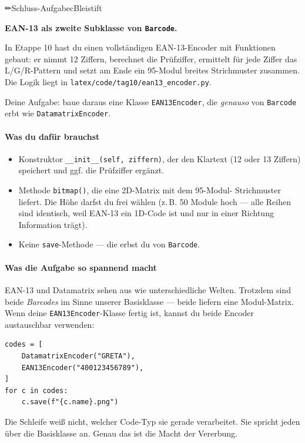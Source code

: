 \begin{aufgabe}{✏}{Schluss-}{Aufgabe}{cBleistift}{\bfseries
EAN-13 als zweite Subklasse von \texttt{Barcode}.\par}

In Etappe 10 hast du einen vollständigen EAN-13-Encoder mit Funktionen
gebaut: er nimmt 12 Ziffern, berechnet die Prüfziffer, ermittelt für
jede Ziffer das L/G/R-Pattern und setzt am Ende ein 95-Modul breites
Strichmuster zusammen. Die Logik liegt in
\texttt{latex/code/tag10/ean13\_encoder.py}.

Deine Aufgabe: baue daraus eine Klasse \texttt{EAN13Encoder}, die
\emph{genauso} von \texttt{Barcode} erbt wie \texttt{DatamatrixEncoder}.

\paragraph{Was du dafür brauchst}
\begin{itemize}
\item Konstruktor \texttt{\_\_init\_\_(self, ziffern)}, der den Klartext
  (12 oder 13 Ziffern) speichert und ggf. die Prüfziffer ergänzt.
\item Methode \texttt{bitmap()}, die eine 2D-Matrix mit dem 95-Modul-
  Strichmuster liefert. Die Höhe darfst du frei wählen
  (z.\,B. 50 Module hoch — alle Reihen sind identisch, weil
  EAN-13 ein 1D-Code ist und nur in einer Richtung Information trägt).
\item Keine \texttt{save}-Methode — die erbst du von
  \texttt{Barcode}.
\end{itemize}

\paragraph{Was die Aufgabe so spannend macht}

EAN-13 und Datamatrix sehen aus wie unterschiedliche Welten. Trotzdem
sind beide \emph{Barcodes} im Sinne unserer Basisklasse — beide
liefern eine Modul-Matrix. Wenn deine \texttt{EAN13Encoder}-Klasse
fertig ist, kannst du beide Encoder austauschbar verwenden:

\begin{verbatim}
codes = [
    DatamatrixEncoder("GRETA"),
    EAN13Encoder("400123456789"),
]
for c in codes:
    c.save(f"{c.name}.png")
\end{verbatim}

Die Schleife weiß nicht, welcher Code-Typ sie gerade verarbeitet.
Sie spricht jeden über die Basisklasse an. Genau das ist die Macht
der Vererbung.


\end{aufgabe}
